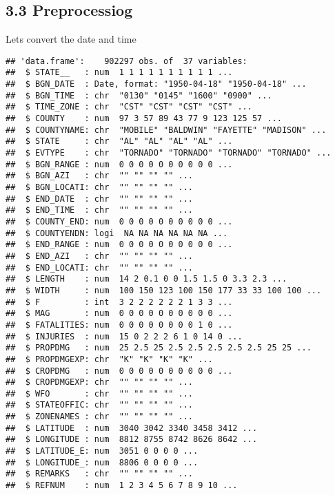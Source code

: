 \documentclass[]{article}
\newenvironment{Shaded}{\begin{snugshade}}{\end{snugshade}}
\newcommand{\KeywordTok}[1]{\textcolor[rgb]{0.13,0.29,0.53}{\textbf{#1}}}
\newcommand{\StringTok}[1]{\textcolor[rgb]{0.31,0.60,0.02}{#1}}
\newcommand{\OperatorTok}[1]{\textcolor[rgb]{0.81,0.36,0.00}{\textbf{#1}}}
\newcommand{\NormalTok}[1]{#1}
\begin{document}
\subsection{3.3 Preprocessiog}\label{preprocessiog}

Lets convert the date and time

\begin{Shaded}
\end{Shaded}

\begin{verbatim}
## 'data.frame':    902297 obs. of  37 variables:
##  $ STATE__   : num  1 1 1 1 1 1 1 1 1 1 ...
##  $ BGN_DATE  : Date, format: "1950-04-18" "1950-04-18" ...
##  $ BGN_TIME  : chr  "0130" "0145" "1600" "0900" ...
##  $ TIME_ZONE : chr  "CST" "CST" "CST" "CST" ...
##  $ COUNTY    : num  97 3 57 89 43 77 9 123 125 57 ...
##  $ COUNTYNAME: chr  "MOBILE" "BALDWIN" "FAYETTE" "MADISON" ...
##  $ STATE     : chr  "AL" "AL" "AL" "AL" ...
##  $ EVTYPE    : chr  "TORNADO" "TORNADO" "TORNADO" "TORNADO" ...
##  $ BGN_RANGE : num  0 0 0 0 0 0 0 0 0 0 ...
##  $ BGN_AZI   : chr  "" "" "" "" ...
##  $ BGN_LOCATI: chr  "" "" "" "" ...
##  $ END_DATE  : chr  "" "" "" "" ...
##  $ END_TIME  : chr  "" "" "" "" ...
##  $ COUNTY_END: num  0 0 0 0 0 0 0 0 0 0 ...
##  $ COUNTYENDN: logi  NA NA NA NA NA NA ...
##  $ END_RANGE : num  0 0 0 0 0 0 0 0 0 0 ...
##  $ END_AZI   : chr  "" "" "" "" ...
##  $ END_LOCATI: chr  "" "" "" "" ...
##  $ LENGTH    : num  14 2 0.1 0 0 1.5 1.5 0 3.3 2.3 ...
##  $ WIDTH     : num  100 150 123 100 150 177 33 33 100 100 ...
##  $ F         : int  3 2 2 2 2 2 2 1 3 3 ...
##  $ MAG       : num  0 0 0 0 0 0 0 0 0 0 ...
##  $ FATALITIES: num  0 0 0 0 0 0 0 0 1 0 ...
##  $ INJURIES  : num  15 0 2 2 2 6 1 0 14 0 ...
##  $ PROPDMG   : num  25 2.5 25 2.5 2.5 2.5 2.5 2.5 25 25 ...
##  $ PROPDMGEXP: chr  "K" "K" "K" "K" ...
##  $ CROPDMG   : num  0 0 0 0 0 0 0 0 0 0 ...
##  $ CROPDMGEXP: chr  "" "" "" "" ...
##  $ WFO       : chr  "" "" "" "" ...
##  $ STATEOFFIC: chr  "" "" "" "" ...
##  $ ZONENAMES : chr  "" "" "" "" ...
##  $ LATITUDE  : num  3040 3042 3340 3458 3412 ...
##  $ LONGITUDE : num  8812 8755 8742 8626 8642 ...
##  $ LATITUDE_E: num  3051 0 0 0 0 ...
##  $ LONGITUDE_: num  8806 0 0 0 0 ...
##  $ REMARKS   : chr  "" "" "" "" ...
##  $ REFNUM    : num  1 2 3 4 5 6 7 8 9 10 ...
\end{verbatim}
\end{document}
